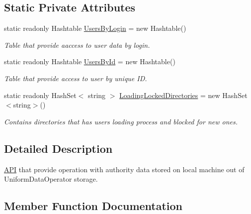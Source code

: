 \subsection*{Static Private Attributes}
\begin{DoxyCompactItemize}
\item 
static readonly Hashtable \mbox{\hyperlink{class_authority_controller_1_1_a_p_i_1_1_local_users_aaae0c59c3cdaf7fcde412e10326059f1}{Users\+By\+Login}} = new Hashtable()
\begin{DoxyCompactList}\small\item\em Table that provide aaccess to user data by login. \end{DoxyCompactList}\item 
static readonly Hashtable \mbox{\hyperlink{class_authority_controller_1_1_a_p_i_1_1_local_users_a7ccc07a39b84ca1871e981bf6f8729ba}{Users\+By\+Id}} = new Hashtable()
\begin{DoxyCompactList}\small\item\em Table that provide access to user by unique ID. \end{DoxyCompactList}\item 
static readonly Hash\+Set$<$ string $>$ \mbox{\hyperlink{class_authority_controller_1_1_a_p_i_1_1_local_users_a6d00e6327f737d23cfdfff3f13ecaec3}{Loading\+Locked\+Directories}} = new Hash\+Set$<$string$>$()
\begin{DoxyCompactList}\small\item\em Contains directories that has users loading process and blocked for new ones. \end{DoxyCompactList}\end{DoxyCompactItemize}


\subsection{Detailed Description}
\mbox{\hyperlink{namespace_authority_controller_1_1_a_p_i}{A\+PI}} that provide operation with authority data stored on local machine out of Uniform\+Data\+Operator storage. 



\subsection{Member Function Documentation}
\mbox{\label{class_authority_controller_1_1_a_p_i_1_1_local_users_a2090f668f0dcc303c254b0bdac6c0701}} 
